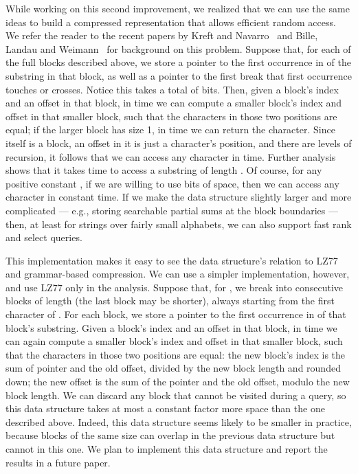 \documentclass[runningheads]{llncs}
\begin{document}
While working on this second improvement, we realized that we can use the same ideas to build a compressed representation that allows efficient random access.  We refer the reader to the recent papers by Kreft and Navarro~\cite{KN10} and Bille, Landau and Weimann~\cite{BLW10} for background on this problem.  Suppose that, for each of the  full blocks described above, we store a pointer to the first occurrence in  of the substring in that block, as well as a pointer to the first break that first occurrence touches or crosses.  Notice this takes a total of  bits.  Then, given a block's index and an offset in that block, in  time we can compute a smaller block's index and offset in that smaller block, such that the characters in those two positions are equal; if the larger block has size 1, in  time we can return the character.  Since  itself is a block, an offset in it is just a character's position, and there are  levels of recursion, it follows that we can access any character in  time.  Further analysis shows that it takes  time to access a substring of length .  Of course, for any positive constant , if we are willing to use  bits of space, then we can access any character in constant time.  If we make the data structure slightly larger and more complicated --- e.g., storing searchable partial sums at the block boundaries --- then, at least for strings over fairly small alphabets, we can also support fast rank and select queries.

This implementation makes it easy to see the data structure's relation to LZ77 and grammar-based compression.  We can use a simpler implementation, however, and use LZ77 only in the analysis.  Suppose that, for , we break  into consecutive blocks of length  (the last block may be shorter), always starting from the first character of .  For each block, we store a pointer to the first occurrence in  of that block's substring.  Given a block's index and an offset in that block, in  time we can again compute a smaller block's index and offset in that smaller block, such that the characters in those two positions are equal: the new block's index is the sum of pointer and the old offset, divided by the new block length and rounded down; the new offset is the sum of the pointer and the old offset, modulo the new block length.  We can discard any block that cannot be visited during a query, so this data structure takes at most a constant factor more space than the one described above.  Indeed, this data structure seems likely to be smaller in practice, because blocks of the same size can overlap in the previous data structure but cannot in this one.  We plan to implement this data structure and report the results in a future paper.



\end{document}
